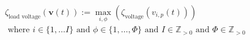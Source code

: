 \begin{equation}
\begin{split}
	\zeta_\text{load voltage}(\textbf{v}(t)) := \max_{i,\phi}\left(\zeta_\text{voltage}(v_{i,p}(t))\right) \\
	\text{ where } i \in \{1, \dots I\} \text{ and } \phi \in \{1, \dots, \Phi\} \text{ and } I \in \mathbb{Z}_{>0} \text{ and } \Phi \in \mathbb{Z}_{>0}
\end{split}
\label{ch1:equ:load-voltage-deviation}
\end{equation}